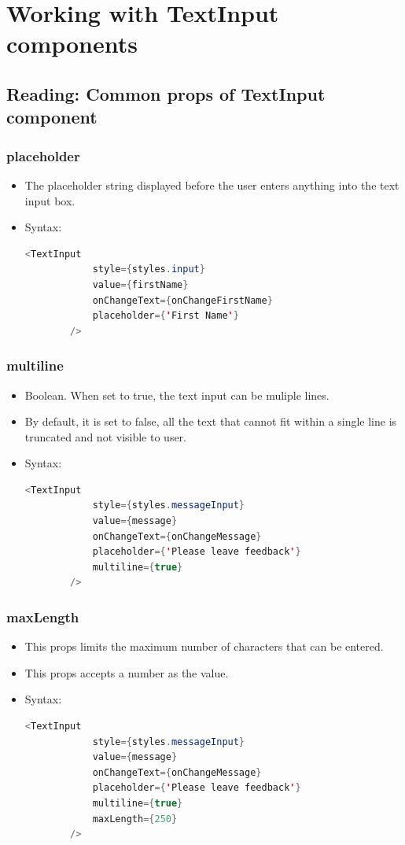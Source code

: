 \chapter{Working with TextInput components}

\section{Reading: Common props of TextInput component}
\subsection{placeholder}
\begin{itemize}
    \item The placeholder string displayed before the user enters anything into the text input box.
    \item Syntax:
    \begin{lstlisting}[language=Java, numbers=none]
        <TextInput 
            style={styles.input} 
            value={firstName} 
            onChangeText={onChangeFirstName} 
            placeholder={'First Name'} 
        /> 
    \end{lstlisting}
\end{itemize}

\subsection{multiline}
\begin{itemize}
    \item Boolean. When set to true, the text input can be muliple lines.
    \item By default, it is set to false, all the text that cannot fit within a single line is truncated and not visible to user.
    \item Syntax:
    \begin{lstlisting}[language=Java, numbers=none]
        <TextInput 
            style={styles.messageInput} 
            value={message} 
            onChangeText={onChangeMessage} 
            placeholder={'Please leave feedback'} 
            multiline={true} 
        />
    \end{lstlisting}
\end{itemize}

\subsection{maxLength}
\begin{itemize}
    \item This props limits the maximum number of characters that can be entered.
    \item This props accepts a number as the value.
    \item Syntax:
    \begin{lstlisting}[language=Java, numbers=none]
        <TextInput 
            style={styles.messageInput} 
            value={message} 
            onChangeText={onChangeMessage} 
            placeholder={'Please leave feedback'} 
            multiline={true} 
            maxLength={250}
        />
    \end{lstlisting}
\end{itemize}

